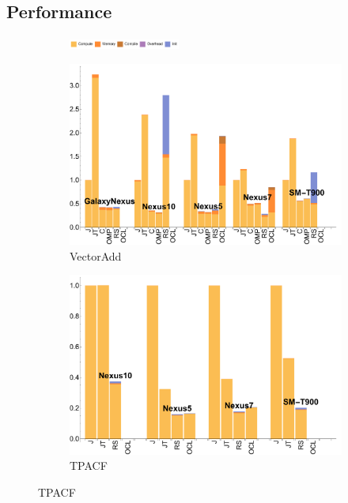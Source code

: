 \subsection{Performance}


\begin{figure}[ht]

  \begin{subfigure}[b]{\textwidth}
          \centering
          \includegraphics[width=0.4\textwidth]{data/legend.pdf}
  \end{subfigure}

  \begin{subfigure}[b]{0.5\textwidth}
      \centering
      \includegraphics[width=\textwidth]{data/VectorAdd_time.pdf}
      \caption{VectorAdd}\label{fig:vectoradd}
  \end{subfigure}
  \begin{subfigure}[b]{0.5\textwidth}
      \centering
      \includegraphics[width=\textwidth]{data/Tpacf_time.pdf}
      \caption{TPACF}
      \label{fig:TPACF}
  \end{subfigure}


\end{figure}
